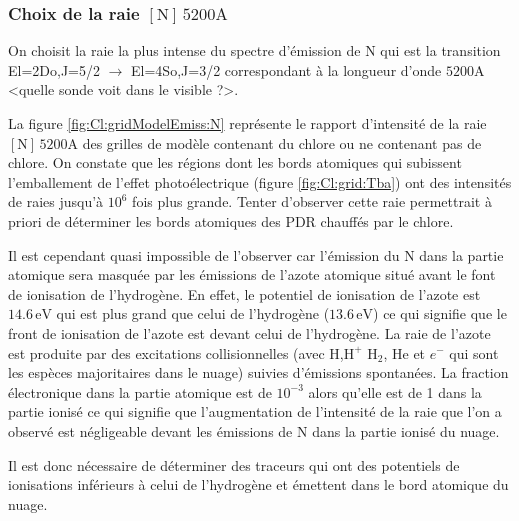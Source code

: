\subsubsection{Choix de la raie $[\mathrm{N}]\,5200 \mathrm{A}$}

On choisit la raie la plus intense du spectre d'émission de $\mathrm{N}$ qui est la transition El=2Do,J=5/2 $\rightarrow$ El=4So,J=3/2 correspondant à la longueur d'onde $5200 \mathrm{A}$ <quelle sonde voit dans le visible ?>. \newline 

La figure \ref{fig:Cl:gridModelEmiss:N} représente le rapport d'intensité de la raie $[\mathrm{N}]\,5200 \mathrm{A}$ des grilles de modèle contenant du chlore ou ne contenant pas de chlore. On constate que les régions dont les bords atomiques qui subissent l'emballement de l'effet photoélectrique (figure \ref{fig:Cl:grid:Tba}) ont des intensités de raies jusqu'à $10^6$ fois plus grande. Tenter d'observer cette raie permettrait à priori de déterminer les bords atomiques des PDR chauffés par le chlore. \newline 

Il est cependant quasi impossible de l'observer car l'émission du $\mathrm{N}$ dans la partie atomique sera masquée par les émissions de l'azote atomique situé avant le font de ionisation de l'hydrogène. En effet, le potentiel de ionisation de l'azote est $14.6\,\mathrm{eV}$ qui est plus grand que celui de l'hydrogène ($13.6\,\mathrm{eV}$) ce qui signifie que le front de ionisation de l'azote est devant celui de l'hydrogène. La raie de l'azote est produite par des excitations collisionnelles (avec $\mathrm{H}$,$\mathrm{H}^+$ $\mathrm{H}_2$, $\mathrm{He}$ et $e^-$ qui sont les espèces majoritaires dans le nuage) suivies d'émissions spontanées. La fraction électronique dans la partie atomique est de $10^{-3}$ alors qu'elle est de 1 dans la partie ionisé ce qui signifie que l'augmentation de l'intensité de la raie que l'on a observé est négligeable devant les émissions de $\mathrm{N}$ dans la partie ionisé du nuage.\newline

Il est donc nécessaire de déterminer des traceurs qui ont des potentiels de ionisations inférieurs à celui de l'hydrogène et émettent dans le bord atomique du nuage. 

